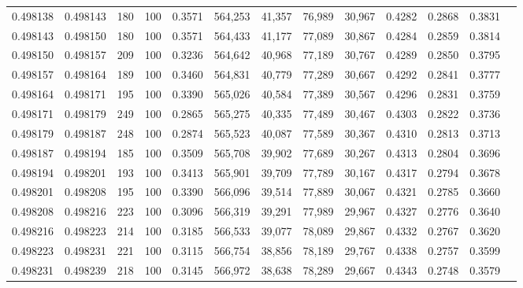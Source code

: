 \begin{tabular}{rrrrrrrrrrrrr}
0.498138 & 0.498143 &   180 & 100 &                                     0.3571 & 564,253 &  41,357 &  76,989 &  30,967 & 0.4282 & 0.2868 & 0.3831 \\
0.498143 & 0.498150 &   180 & 100 &                                     0.3571 & 564,433 &  41,177 &  77,089 &  30,867 & 0.4284 & 0.2859 & 0.3814 \\
0.498150 & 0.498157 &   209 & 100 &                                     0.3236 & 564,642 &  40,968 &  77,189 &  30,767 & 0.4289 & 0.2850 & 0.3795 \\
0.498157 & 0.498164 &   189 & 100 &                                     0.3460 & 564,831 &  40,779 &  77,289 &  30,667 & 0.4292 & 0.2841 & 0.3777 \\
0.498164 & 0.498171 &   195 & 100 &                                     0.3390 & 565,026 &  40,584 &  77,389 &  30,567 & 0.4296 & 0.2831 & 0.3759 \\
0.498171 & 0.498179 &   249 & 100 &                                     0.2865 & 565,275 &  40,335 &  77,489 &  30,467 & 0.4303 & 0.2822 & 0.3736 \\
0.498179 & 0.498187 &   248 & 100 &                                     0.2874 & 565,523 &  40,087 &  77,589 &  30,367 & 0.4310 & 0.2813 & 0.3713 \\
0.498187 & 0.498194 &   185 & 100 &                                     0.3509 & 565,708 &  39,902 &  77,689 &  30,267 & 0.4313 & 0.2804 & 0.3696 \\
0.498194 & 0.498201 &   193 & 100 &                                     0.3413 & 565,901 &  39,709 &  77,789 &  30,167 & 0.4317 & 0.2794 & 0.3678 \\
0.498201 & 0.498208 &   195 & 100 &                                     0.3390 & 566,096 &  39,514 &  77,889 &  30,067 & 0.4321 & 0.2785 & 0.3660 \\
0.498208 & 0.498216 &   223 & 100 &                                     0.3096 & 566,319 &  39,291 &  77,989 &  29,967 & 0.4327 & 0.2776 & 0.3640 \\
0.498216 & 0.498223 &   214 & 100 &                                     0.3185 & 566,533 &  39,077 &  78,089 &  29,867 & 0.4332 & 0.2767 & 0.3620 \\
0.498223 & 0.498231 &   221 & 100 &                                     0.3115 & 566,754 &  38,856 &  78,189 &  29,767 & 0.4338 & 0.2757 & 0.3599 \\
0.498231 & 0.498239 &   218 & 100 &                                     0.3145 & 566,972 &  38,638 &  78,289 &  29,667 & 0.4343 & 0.2748 & 0.3579 \\

\end{tabular}
